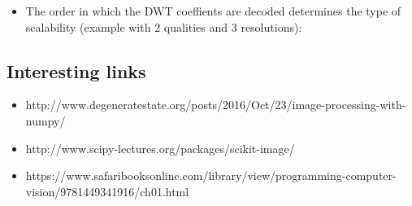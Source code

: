 \begin{itemize}
\tightlist
\item
  The order in which the DWT coeﬃents are decoded determines the type of
  scalability (example with 2 qualities and 3 resolutions):
\end{itemize}

    

    \hypertarget{interesting-links}{%
\subsection{Interesting links}\label{interesting-links}}

\begin{itemize}
\tightlist
\item
  http://www.degeneratestate.org/posts/2016/Oct/23/image-processing-with-numpy/
\item
  http://www.scipy-lectures.org/packages/scikit-image/
\item
  https://www.safaribooksonline.com/library/view/programming-computer-vision/9781449341916/ch01.html
\end{itemize}


    
    
    
    
